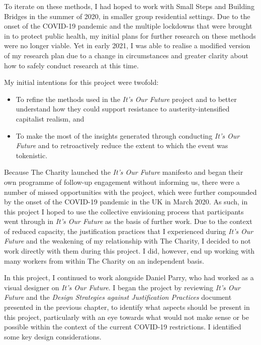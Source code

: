 To iterate on these methods, I had hoped to work with Small Steps and Building Bridges in the summer of 2020, in smaller group residential settings. Due to the onset of the COVID-19 pandemic and the multiple lockdowns that were brought in to protect public health, my initial plans for further research on these methods were no longer viable. Yet in early 2021, I was able to realise a modified version of my research plan due to a change in circumstances and greater clarity about how to safely conduct research at this time.

My initial intentions for this project were twofold: 
\begin{itemize}
    \item To refine the methods used in the \emph{It's Our Future} project and to better understand how they could support resistance to austerity-intensified capitalist realism, and 
    \item To make the most of the insights generated through conducting \emph{It's Our Future} and to retroactively reduce the extent to which the event was tokenistic.
\end{itemize}
Because The Charity launched the \emph{It's Our Future} manifesto and began their own programme of follow-up engagement without informing us, there were a number of missed opportunities with the project, which were further compounded by the onset of the COVID-19 pandemic in the UK in March 2020. As such, in this project I hoped to use the collective envisioning process that participants went through in \emph{It's Our Future} as the basis of further work. Due to the context of reduced capacity, the justification practices that I experienced during \emph{It's Our Future} and the weakening of my relationship with The Charity, I decided to not work directly with them during this project. I did, however, end up working with many workers from within The Charity on an independent basis.

In this project, I continued to work alongside Daniel Parry, who had worked as a visual designer on \textit{It's Our Future}. I began the project by reviewing \emph{It's Our Future} and the \emph{Design Strategies against Justification Practices} document presented in the previous chapter, to identify what aspects should be present in this project, particularly with an eye towards what would not make sense or be possible within the context of the current COVID-19 restrictions.  I identified some key design considerations. 

